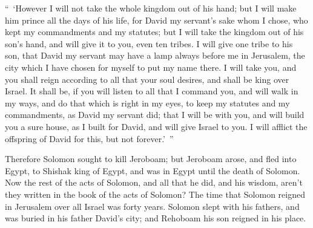 {\par }{\PP {}“ ‘However I will not take the whole kingdom out of his hand; but I will make him prince all the days of his life, for David my servant’s sake whom I chose, who kept my commandments and my statutes;
but I will take the kingdom out of his son’s hand, and will give it to you, even ten tribes.
I will give one tribe to his son, that David my servant may have a lamp always before me in Jerusalem, the city which I have chosen for myself to put my name there.
I will take you, and you shall reign according to all that your soul desires, and shall be king over Israel.
It shall be, if you will listen to all that I command you, and will walk in my ways, and do that which is right in my eyes, to keep my statutes and my commandments, as David my servant did; that I will be with you, and will build you a sure house, as I built for David, and will give Israel to you.
I will afflict the offspring of David for this, but not forever.’ ”
\par }{\PP {}Therefore Solomon sought to kill Jeroboam; but Jeroboam arose, and fled into Egypt, to Shishak king of Egypt, and was in Egypt until the death of Solomon.
Now the rest of the acts of Solomon, and all that he did, and his wisdom, aren’t they written in the book of the acts of Solomon?
The time that Solomon reigned in Jerusalem over all Israel was forty years.
Solomon slept with his fathers, and was buried in his father David’s city; and Rehoboam his son reigned in his place.

}
